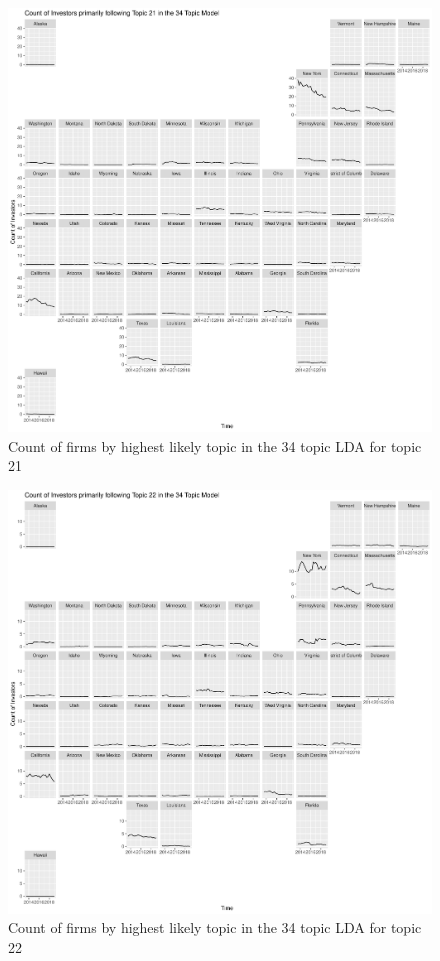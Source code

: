 \begin{figure}
	\centering
	\includegraphics[width=1\linewidth]{Figures/ChapterV/USA_34_Topic21.pdf}
	\caption[Count of Firms for Topic 21 by Quarter]{Count of firms by highest likely topic in the 34 topic LDA for topic 21}
	\label{fig:StateLDA21}
\end{figure}

\begin{figure}
	\centering
	\includegraphics[width=1\linewidth]{Figures/ChapterV/USA_34_Topic22.pdf}
	\caption[Count of Firms for Topic 22 by Quarter]{Count of firms by highest likely topic in the 34 topic LDA for topic 22}
	\label{fig:StateLDA22}
\end{figure}

